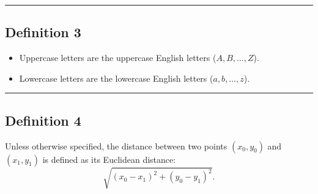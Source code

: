 \documentclass[noproblemids,a4paper]{problemset}
\begin{document}
\vskip 20pt
\hrule
\vskip 20pt

\subsection*{Definition 3}

\begin{itemize}
  \item Uppercase letters are the uppercase English letters ($A, B, \dots , Z$).
  \item Lowercase letters are the lowercase English letters ($a, b, \dots , z$).
\end{itemize}

\vskip 20pt
\hrule
\vskip 20pt

\subsection*{Definition 4}

Unless otherwise specified, the distance between two points $(x_0, y_0)$ and $(x_1, y_1)$ is defined as its Euclidean distance: $$\sqrt{(x_0-x_1)^2 + (y_0-y_1)^2}.$$


\end{document}
